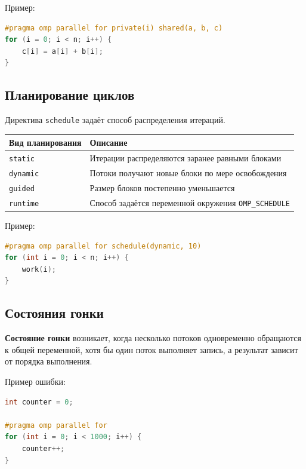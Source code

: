 \documentclass[12pt,a4paper]{article}
\begin{document}
Пример:

\begin{lstlisting}[language=C]
#pragma omp parallel for private(i) shared(a, b, c)
for (i = 0; i < n; i++) {
    c[i] = a[i] + b[i];
}
\end{lstlisting}

\subsection{Планирование циклов}

Директива \texttt{schedule} задаёт способ распределения итераций.

\begin{center}
\begin{tabular}{|p{5cm}|p{9cm}|}
\hline
\textbf{Вид планирования} & \textbf{Описание} \\
\hline
\texttt{static} & Итерации распределяются заранее равными блоками \\
\hline
\texttt{dynamic} & Потоки получают новые блоки по мере освобождения \\
\hline
\texttt{guided} & Размер блоков постепенно уменьшается \\
\hline
\texttt{runtime} & Способ задаётся переменной окружения \texttt{OMP\_SCHEDULE} \\
\hline
\end{tabular}
\end{center}

Пример:

\begin{lstlisting}[language=C]
#pragma omp parallel for schedule(dynamic, 10)
for (int i = 0; i < n; i++) {
    work(i);
}
\end{lstlisting}

\subsection{Состояния гонки}

\textbf{Состояние гонки} возникает, когда несколько потоков одновременно обращаются к общей переменной, хотя бы один поток выполняет запись, а результат зависит от порядка выполнения.

Пример ошибки:

\begin{lstlisting}[language=C]
int counter = 0;

#pragma omp parallel for
for (int i = 0; i < 1000; i++) {
    counter++;
}
\end{lstlisting}
\end{document}
